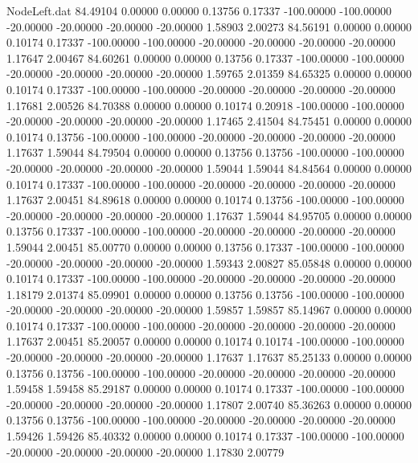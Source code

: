 \begin{filecontents}{NodeLeft.dat}
  84.49104    0.00000    0.00000     0.13756    0.17337 -100.00000 -100.00000  -20.00000  -20.00000  -20.00000  -20.00000    1.58903    2.00273
  84.56191    0.00000    0.00000     0.10174    0.17337 -100.00000 -100.00000  -20.00000  -20.00000  -20.00000  -20.00000    1.17647    2.00467
  84.60261    0.00000    0.00000     0.13756    0.17337 -100.00000 -100.00000  -20.00000  -20.00000  -20.00000  -20.00000    1.59765    2.01359
  84.65325    0.00000    0.00000     0.10174    0.17337 -100.00000 -100.00000  -20.00000  -20.00000  -20.00000  -20.00000    1.17681    2.00526
  84.70388    0.00000    0.00000     0.10174    0.20918 -100.00000 -100.00000  -20.00000  -20.00000  -20.00000  -20.00000    1.17465    2.41504
  84.75451    0.00000    0.00000     0.10174    0.13756 -100.00000 -100.00000  -20.00000  -20.00000  -20.00000  -20.00000    1.17637    1.59044
  84.79504    0.00000    0.00000     0.13756    0.13756 -100.00000 -100.00000  -20.00000  -20.00000  -20.00000  -20.00000    1.59044    1.59044
  84.84564    0.00000    0.00000     0.10174    0.17337 -100.00000 -100.00000  -20.00000  -20.00000  -20.00000  -20.00000    1.17637    2.00451
  84.89618    0.00000    0.00000     0.10174    0.13756 -100.00000 -100.00000  -20.00000  -20.00000  -20.00000  -20.00000    1.17637    1.59044
  84.95705    0.00000    0.00000     0.13756    0.17337 -100.00000 -100.00000  -20.00000  -20.00000  -20.00000  -20.00000    1.59044    2.00451
  85.00770    0.00000    0.00000     0.13756    0.17337 -100.00000 -100.00000  -20.00000  -20.00000  -20.00000  -20.00000    1.59343    2.00827
  85.05848    0.00000    0.00000     0.10174    0.17337 -100.00000 -100.00000  -20.00000  -20.00000  -20.00000  -20.00000    1.18179    2.01374
  85.09901    0.00000    0.00000     0.13756    0.13756 -100.00000 -100.00000  -20.00000  -20.00000  -20.00000  -20.00000    1.59857    1.59857
  85.14967    0.00000    0.00000     0.10174    0.17337 -100.00000 -100.00000  -20.00000  -20.00000  -20.00000  -20.00000    1.17637    2.00451
  85.20057    0.00000    0.00000     0.10174    0.10174 -100.00000 -100.00000  -20.00000  -20.00000  -20.00000  -20.00000    1.17637    1.17637
  85.25133    0.00000    0.00000     0.13756    0.13756 -100.00000 -100.00000  -20.00000  -20.00000  -20.00000  -20.00000    1.59458    1.59458
  85.29187    0.00000    0.00000     0.10174    0.17337 -100.00000 -100.00000  -20.00000  -20.00000  -20.00000  -20.00000    1.17807    2.00740
  85.36263    0.00000    0.00000     0.13756    0.13756 -100.00000 -100.00000  -20.00000  -20.00000  -20.00000  -20.00000    1.59426    1.59426
  85.40332    0.00000    0.00000     0.10174    0.17337 -100.00000 -100.00000  -20.00000  -20.00000  -20.00000  -20.00000    1.17830    2.00779

\end{filecontents}
